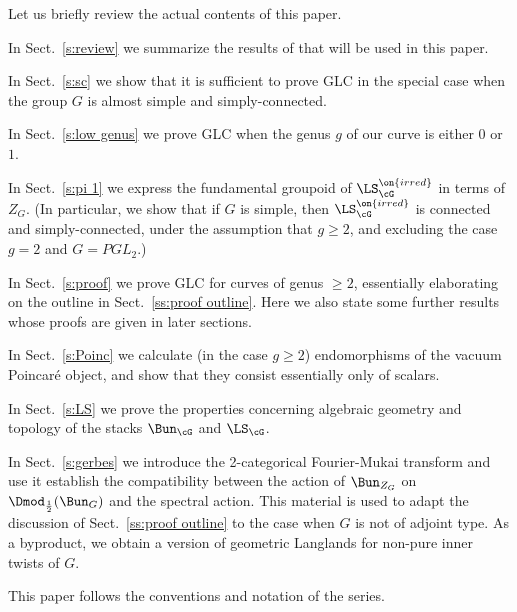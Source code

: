 \documentclass[9pt]{amsart}
\theoremstyle{remark}
\theoremstyle{definition}
\theoremstyle{remark}
\newcommand{\secref}[1]{Sect.~\ref{#1}}
\numberwithin{equation}{section}
\begin{document}

\sssec{}

Let us briefly review the actual contents of this paper.

\medskip

In \secref{s:review} we summarize the results of \cite{GLC1,GLC2,GLC3,GLC4} that will be used in this paper.

\medskip

In \secref{s:sc} we show that it is sufficient to prove GLC in the special case when the group $G$ is 
almost simple and simply-connected.

\medskip

In \secref{s:low genus} we prove GLC when the genus $g$ of our curve is either $0$ or $1$.

\medskip

In \secref{s:pi 1} we express the fundamental groupoid of $\LS_\cG^{\on{irred}}$ in terms of $Z_G$.
(In particular, we show that if $G$ is simple, then $\LS_\cG^{\on{irred}}$ is connected and simply-connected,
under the assumption that $g\geq 2$, and excluding the case $g=2$ and $G=PGL_2$.) 

\medskip

In \secref{s:proof} we prove GLC for curves of genus $\geq 2$, essentially elaborating on the outline in \secref{ss:proof outline}. Here we also state some further results whose
proofs are given in later sections.

\medskip

In \secref{s:Poinc} we calculate (in the case $g\geq 2$) endomorphisms of the vacuum Poincar\'e object,
and show that they consist essentially only of scalars. 

\medskip

In \secref{s:LS} we prove the properties concerning algebraic geometry and topology of the stacks $\Bun_\cG$ and $\LS_\cG$.

\medskip

In \secref{s:gerbes} we introduce the 2-categorical Fourier-Mukai transform and use it 
establish the compatibility between the action of $\Bun_{Z_G}$ on $\Dmod_{\frac{1}{2}}(\Bun_G)$ and
the spectral action. This material is used to adapt the discussion of 
\secref{ss:proof outline} to the case when $G$ is not of adjoint type. As a byproduct, we obtain
a version of geometric Langlands for non-pure inner twists of $G$. 


This paper follows the conventions and notation of the \cite{GLC1,GLC2,GLC3,GLC4} series. 
\end{document}
